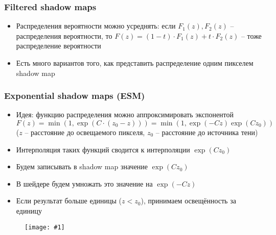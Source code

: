 \documentclass{beamer}
\newcommand{\slideimage}[1]{
  \begin{figure}
    \begin{adjustbox}{width=\textwidth, totalheight=\textheight-2\baselineskip-2\baselineskip,keepaspectratio}
      \texttt{[image: \#1]}
    \end{adjustbox}
  \end{figure}
}
\begin{document}
\begin{frame}[fragile]
\frametitle{Filtered shadow maps}
\begin{itemize}
\item Распределения вероятности можно усреднять: если \begin{math}F_1(z), F_2(z)\end{math} -- распределения вероятности, то \begin{math}F(z) = (1 - t) \cdot F_1(z) + t \cdot F_2(z)\end{math} -- тоже распределение вероятности
\pause
\item Есть много вариантов того, как представить распределение одним пикселем shadow map
\end{itemize}
\end{frame}

\begin{frame}[fragile]
\frametitle{Exponential shadow maps (ESM)}
\begin{itemize}
\item Идея: функцию распределения можно аппроксимировать экспонентой \begin{math}F(z) = \min(1, \exp(C \cdot (z_0 - z))) = \min(1, \exp(-Cz)\exp(Cz_0))\end{math} (\begin{math}z\end{math} -- расстояние до освещаемого пикселя, \begin{math}z_0\end{math} -- расстояние до источника тени)
\pause
\item Интерполяция таких функций сводится к интерполяции \begin{math}\exp(Cz_0)\end{math}
\pause
\item Будем записывать в shadow map значение \begin{math}\exp(Cz_0)\end{math}
\pause
\item В шейдере будем умножать это значение на \begin{math}\exp(-Cz)\end{math}
\pause
\item Если результат больше единицы (\begin{math}z < z_0\end{math}), принимаем освещённость за единицу
\pause
\end{itemize}
\slideimage{exp_plot.png}
\end{frame}
\end{document}
